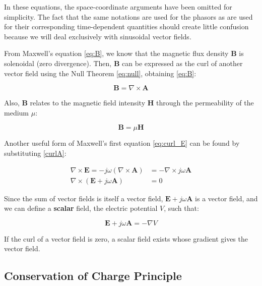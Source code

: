 In these equations, the space-coordinate arguments 
have been omitted for simplicity. The fact that 
the same notations are used for the phasors as 
are used for their corresponding time-dependent 
quantities should create little confusion because 
we will deal exclusively with sinusoidal vector 
fields.

From Maxwell's equation \ref{eq:B}, we know that 
the magnetic flux density \(\mathbf{B}\) is solenoidal 
(zero divergence). Then, \(\mathbf{B}\) can be expressed 
as the curl of another vector field using the 
Null Theorem \ref{eq:null}, obtaining \ref{eq:B}:

\begin{equation}
    \mathbf{B} = \nabla \times \mathbf{A}
    \label{curlA}
\end{equation}

Also, \(\mathbf{B}\) relates to the magnetic field 
intensity \(\mathbf{H}\) through the permeability of 
the medium \(\mu\):

\begin{equation}
    \mathbf{B} = \mu \mathbf{H}
    \label{eq:BH}
\end{equation}

Another useful form of Maxwell's first equation 
\ref{eq:curl_E} can be found by substituting 
\ref{curlA}:

\begin{align}
    \nabla \times \mathbf{E} = - j \omega 
    (\nabla \times \mathbf{A}) &= -\nabla \times 
    j \omega \mathbf{A} \nonumber \\
    \nabla \times \left(\mathbf{E} + 
    j \omega \mathbf{A}\right) &= 0 \nonumber
\end{align}

Since the sum of vector fields is itself a vector 
field, \(\mathbf{E} + j \omega \mathbf{A}\) is a 
vector field, and we can define a \textbf{scalar} 
field, the electric potential \(V\), such that:

\begin{equation}
    \mathbf{E} + j \omega \mathbf{A} = -\nabla V
    \label{eq:V}
\end{equation}

If the curl of a vector field is zero, a scalar 
field exists whose gradient gives the vector field.

\subsection{Conservation of Charge Principle}

